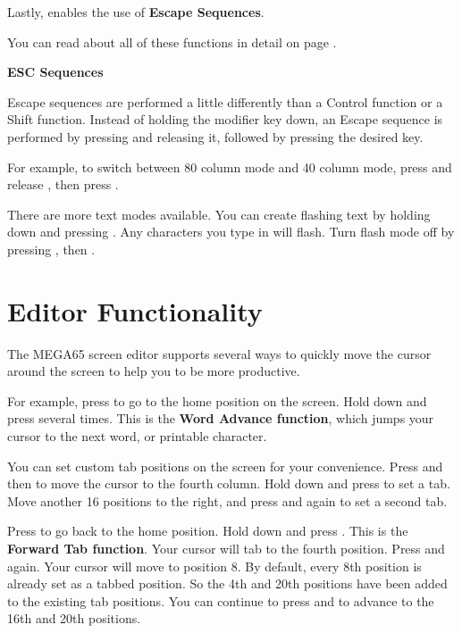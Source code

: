 Lastly,  enables the use of \textbf{Escape Sequences}.

You can read about all of these functions in detail on page \pageref{appendix:controlcodes}.

\needspace{2cm}
\textbf{ESC Sequences}

Escape sequences are performed a little differently than a Control function or a Shift function. Instead of holding the modifier key down, an Escape sequence is performed by pressing  and releasing it, followed by pressing the desired key.

For example, to switch between 80 column mode and 40 column mode, press and release , then press .

There are more text modes available. You can create flashing text by holding  down and pressing . Any characters you type in will flash. Turn flash mode off by pressing , then .


\section{Editor Functionality}

The MEGA65 screen editor supports several ways to quickly move the cursor around the screen to help you to be more productive.

For example, press  to go to the home position on the screen. Hold  down and press  several times. This is the \textbf{Word Advance function}, which jumps your cursor to the next word, or printable character.

You can set custom tab positions on the screen for your convenience. Press  and then \megakey{$\rightarrow$} to move the cursor to the fourth column. Hold down  and press  to set a tab. Move another 16 positions to the right, and press  and  again to set a second tab.

Press  to go back to the home position. Hold  down and press . This is the \textbf{Forward Tab function}. Your cursor will tab to the fourth position. Press  and  again. Your cursor will move to position 8. By default, every 8th position is already set as a tabbed position. So the 4th and 20th positions have been added to the existing tab positions. You can continue to press  and  to advance to the 16th and 20th positions.

